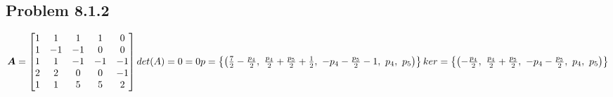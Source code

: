 \documentclass[12pt]{article}
\begin{document}
    \subsection{Problem 8.1.2}\label{subsec:812}

    \begin{math}
        {\bm{A}}=\left[\begin{matrix}
                      1 & 1 & 1 & 1 & 0\\1 & -1 & -1 & 0 & 0\\1 & 1 & -1 & -1 & -1\\2 & 2 & 0 & 0 & -1\\1 & 1 & 5 & 5 & 2
        \end{matrix}\right] \\
        det(A)=0=0 \\
        p=\left\{\left( \frac{7}{2} - \frac{p_{4}}{2}, \  \frac{p_{4}}{2} + \frac{p_{5}}{2} + \frac{1}{2}, \  - p_{4} - \frac{p_{5}}{2} - 1, \  p_{4}, \  p_{5}\right)\right\} \\
        ker=\left\{\left( - \frac{p_{4}}{2}, \  \frac{p_{4}}{2} + \frac{p_{5}}{2}, \  - p_{4} - \frac{p_{5}}{2}, \  p_{4}, \  p_{5}\right)\right\}
    \end{math}
\end{document}
